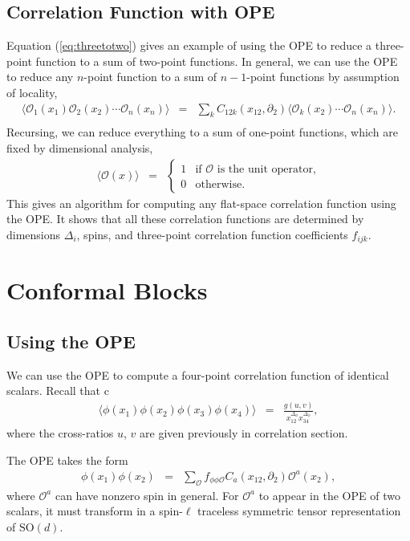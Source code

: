 \documentclass[12pt]{article}
\numberwithin{equation}{section}
\newcommand\be{\begin{eqnarray}}
\newcommand\ee{\end{eqnarray}}
\newcommand\f\phi
\newcommand\cO{\mathcal{O}}
\newcommand\ptl\partial
\newcommand\<\langle
\renewcommand\>\rangle
\newcommand\R{\mathbb{R}}
\newcommand\nn{\nonumber}
\renewcommand\.{\cdot}
\newcommand\x\times
\newcommand\SO{\mathrm{SO}}
\newcommand\De{\Delta}
\renewcommand\b\beta
\begin{document}
\subsection{Correlation Function with OPE}

Equation (\ref{eq:threetotwo}) gives an example of using the OPE to reduce a three-point function to a sum of two-point functions.  In general, we can use the OPE to reduce any $n$-point function to a sum of $n-1$-point functions by assumption of locality,
\be
\<\cO_1(x_1)\cO_2(x_2)\cdots\cO_n(x_n)\> &=& \sum_k C_{12k}(x_{12},\ptl_2)\<\cO_k(x_2)\cdots\cO_n(x_n)\>.\nn\\
\ee
Recursing, we can reduce everything to a sum of one-point functions, which are fixed by dimensional analysis,
\be
\<\cO(x)\> &=& \begin{cases}
1 & \textrm{if $\cO$ is the unit operator,}\\
0 & \textrm{otherwise.}
\end{cases}
\ee
This gives an algorithm for computing any flat-space correlation function using the OPE\@.  It shows that all these correlation functions are determined by dimensions $\De_i$, spins, and three-point correlation function coefficients $f_{ijk}$.

\section{Conformal Blocks}

\subsection{Using the OPE}

We can use the OPE to compute a four-point correlation function of identical scalars.  Recall that c
\be
\<\f(x_1)\f(x_2)\f(x_3)\f(x_4)\> &=& \frac{g(u,v)}{x_{12}^{\De_\f}x_{34}^{\De_\f}},
\ee
where the cross-ratios $u$, $v$ are given previously in correlation section.

The OPE takes the form
\be
\label{eq:scalarscalarOPE}
\f(x_1)\f(x_2) &=& \sum_\cO f_{\f\f\cO} C_{a}(x_{12},\ptl_2)\cO^{a}(x_2),
\ee
where $\cO^{a}$ can have nonzero spin in general.  For $\cO^a$ to appear in the OPE of two scalars, it must transform in a spin-$\ell$ traceless symmetric tensor representation of $\SO(d)$.
\end{document}
